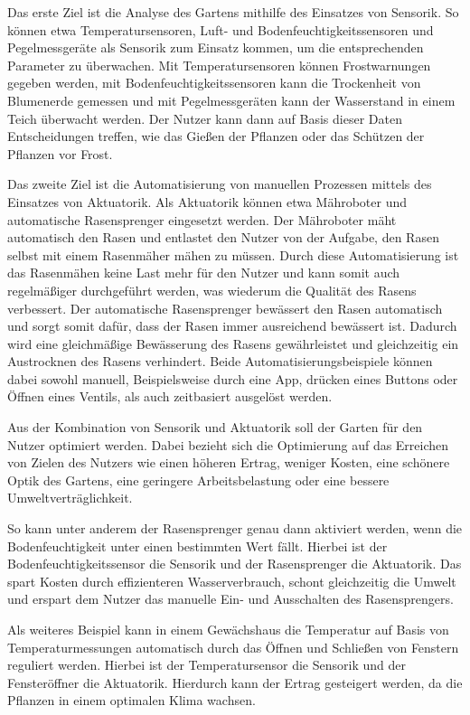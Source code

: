 \pagebreak

Das erste Ziel ist die Analyse des Gartens mithilfe des Einsatzes von Sensorik.
So können etwa Temperatursensoren, Luft- und Bodenfeuchtigkeitssensoren und Pegelmessgeräte als Sensorik zum Einsatz kommen, um die entsprechenden Parameter zu überwachen.
Mit Temperatursensoren können Frostwarnungen gegeben werden, mit Bodenfeuchtigkeitssensoren kann die Trockenheit von Blumenerde gemessen und mit Pegelmessgeräten kann der Wasserstand in einem Teich überwacht werden.
Der Nutzer kann dann auf Basis dieser Daten Entscheidungen treffen, wie das Gießen der Pflanzen oder das Schützen der Pflanzen vor Frost.

Das zweite Ziel ist die Automatisierung von manuellen Prozessen mittels des Einsatzes von Aktuatorik.
Als Aktuatorik können etwa Mähroboter und automatische Rasensprenger eingesetzt werden.
Der Mähroboter mäht automatisch den Rasen und entlastet den Nutzer von der Aufgabe, den Rasen selbst mit einem Rasenmäher mähen zu müssen.
Durch diese Automatisierung ist das Rasenmähen keine Last mehr für den Nutzer und kann somit auch regelmäßiger durchgeführt werden, was wiederum die Qualität des Rasens verbessert.
Der automatische Rasensprenger bewässert den Rasen automatisch und sorgt somit dafür, dass der Rasen immer ausreichend bewässert ist.
Dadurch wird eine gleichmäßige Bewässerung des Rasens gewährleistet und gleichzeitig ein Austrocknen des Rasens verhindert.
Beide Automatisierungsbeispiele können dabei sowohl manuell, Beispielsweise durch eine App, drücken eines Buttons oder Öffnen eines Ventils, als auch zeitbasiert ausgelöst werden.

Aus der Kombination von Sensorik und Aktuatorik soll der Garten für den Nutzer optimiert werden.
Dabei bezieht sich die Optimierung auf das Erreichen von Zielen des Nutzers wie einen höheren Ertrag, weniger Kosten, eine schönere Optik des Gartens, eine geringere Arbeitsbelastung oder eine bessere Umweltverträglichkeit.

So kann unter anderem der Rasensprenger genau dann aktiviert werden, wenn die Bodenfeuchtigkeit unter einen bestimmten Wert fällt.
Hierbei ist der Bodenfeuchtigkeitssensor die Sensorik und der Rasensprenger die Aktuatorik.
Das spart Kosten durch effizienteren Wasserverbrauch, schont gleichzeitig die Umwelt und erspart dem Nutzer das manuelle Ein- und Ausschalten des Rasensprengers.

Als weiteres Beispiel kann in einem Gewächshaus die Temperatur auf Basis von Temperaturmessungen automatisch durch das Öffnen und Schließen von Fenstern reguliert werden.
Hierbei ist der Temperatursensor die Sensorik und der Fensteröffner die Aktuatorik.
Hierdurch kann der Ertrag gesteigert werden, da die Pflanzen in einem optimalen Klima wachsen.

